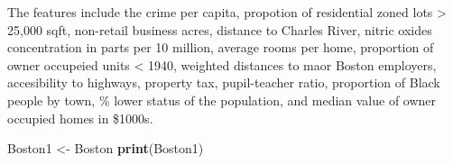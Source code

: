 \documentclass[]{article}
\newenvironment{Shaded}{\begin{snugshade}}{\end{snugshade}}
\newcommand{\KeywordTok}[1]{\textcolor[rgb]{0.13,0.29,0.53}{\textbf{#1}}}
\newcommand{\StringTok}[1]{\textcolor[rgb]{0.31,0.60,0.02}{#1}}
\newcommand{\NormalTok}[1]{#1}
\begin{document}
The features include the crime per capita, propotion of residential
zoned lots \textgreater{} 25,000 sqft, non-retail business acres,
distance to Charles River, nitric oxides concentration in parts per 10
million, average rooms per home, proportion of owner occupeied units
\textless{} 1940, weighted distances to maor Boston employers,
accesibility to highways, property tax, pupil-teacher ratio, proportion
of Black people by town, \% lower status of the population, and median
value of owner occupied homes in \$1000s.

\begin{Shaded}
\begin{Highlighting}[]
\NormalTok{Boston1 <-}\StringTok{ }\NormalTok{Boston}
\KeywordTok{print}\NormalTok{(Boston1)}
\end{Highlighting}
\end{Shaded}
\end{document}
